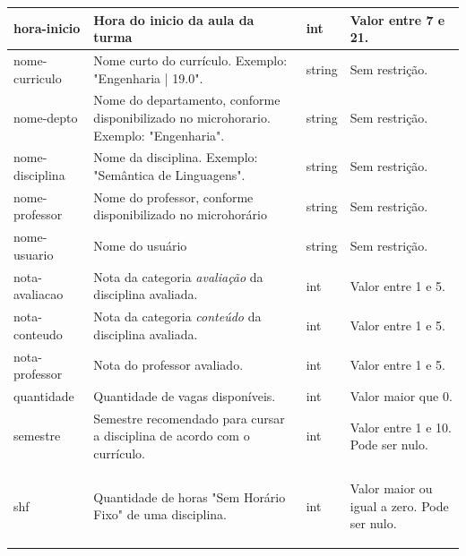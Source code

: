 \begin{longtable}{ | >{\raggedright}m{} | >{\raggedright}m{} | >{\raggedright}m{} | >{\raggedright}m{} | }
    hora-inicio & Hora do inicio da aula da turma & int & Valor entre 7 e 21.\tabularnewline\hline
    nome-curriculo & Nome curto do currículo. Exemplo: "Engenharia | 19.0". & string & Sem restrição.\tabularnewline\hline
    nome-depto & Nome do departamento, conforme disponibilizado no microhorario. Exemplo: "Engenharia". & string & Sem restrição.\tabularnewline\hline
    nome-disciplina & Nome da disciplina. Exemplo: "Semântica de Linguagens". & string & Sem restrição.\tabularnewline\hline
    nome-professor & Nome do professor, conforme disponibilizado no microhorário & string & Sem restrição.\tabularnewline\hline
    nome-usuario & Nome do usuário & string & Sem restrição.\tabularnewline\hline
    nota-avaliacao & Nota da categoria \textit{avaliação} da disciplina avaliada. & int & Valor entre 1 e 5.\tabularnewline\hline
    nota-conteudo & Nota da categoria \textit{conteúdo} da disciplina avaliada. & int & Valor entre 1 e 5.\tabularnewline\hline
    nota-professor & Nota do professor avaliado. & int & Valor entre 1 e 5.\tabularnewline\hline
    quantidade & Quantidade de vagas disponíveis. & int & Valor maior que 0.\tabularnewline\hline
    semestre & Semestre recomendado para cursar a disciplina de acordo com o currículo. & int & Valor entre 1 e 10. Pode ser nulo.\tabularnewline\hline
    shf & Quantidade de horas "Sem Horário Fixo" de uma disciplina. & int & Valor maior ou igual a zero. Pode ser nulo.

    \label{tab:dicionario-dados}
\end{longtable}

